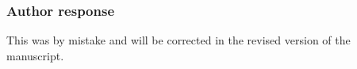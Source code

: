 \documentclass[11pt]{scrartcl}
\providecommand{\DIFadd}[1]{{\protect\textcolor{blue}{\uwave{#1}}}} %
\providecommand{\DIFaddFL}[1]{\DIFadd{#1}} %
\begin{document}
\subsubsection*{Author response}

This was by mistake and will be corrected in the revised version of the
manuscript.

%
\end{document}
